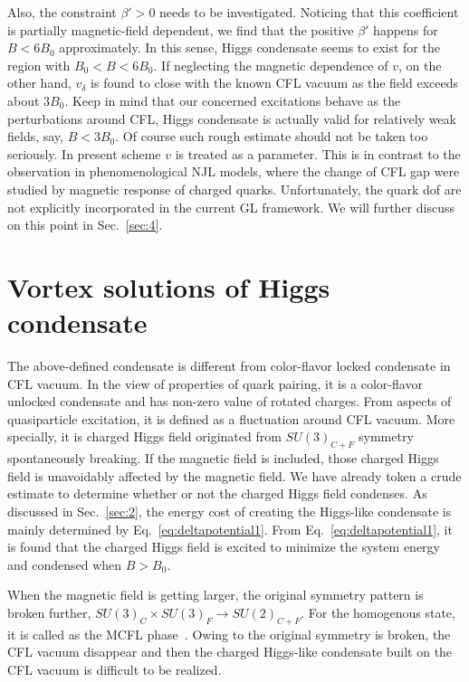 \documentclass[12pt]{article}
\begin{document}
Also, the constraint $\beta'> 0$ needs to be investigated. Noticing that this coefficient is
partially magnetic-field dependent, we find that the positive $\beta'$ happens for $B < 6 B_0$ approximately.
In this sense, Higgs condensate seems to exist for the region with $B_0< B < 6 B_0$.
If neglecting the magnetic dependence of $v$, on the other hand, $v_\delta$ is found to close with the known
CFL vacuum as the field exceeds about $3 B_0$. Keep in mind that our concerned excitations behave as the
perturbations around CFL, Higgs condensate is actually valid for relatively weak fields, say, $B < 3 B_0$.
Of course such rough estimate should not be taken too seriously.
In present scheme $v$ is treated as a parameter. This is in contrast to the
observation in phenomenological NJL models, where the change of CFL gap were studied by magnetic response of charged quarks. 
Unfortunately, the quark dof are not explicitly incorporated in the current GL framework.
We will further discuss on this point in Sec.~\ref{sec:4}.


\section{\bf Vortex solutions of Higgs condensate}
\label{sec:3}
\vspace{0.2cm}

The above-defined condensate is different from color-flavor
locked condensate in CFL vacuum.
In the view of properties of quark pairing, it is a color-flavor unlocked condensate
and has non-zero value of rotated charges.
From aspects of quasiparticle excitation, it is
defined as a fluctuation around CFL vacuum.
More specially, it is charged Higgs field originated from $SU(3)_{C+F}$
 symmetry spontaneously breaking.
If the magnetic field is included,
those charged Higgs field is unavoidably affected by the magnetic field.
We  have already token a crude estimate to determine whether or not the 
charged Higgs field condenses.
As discussed in Sec.~\ref{sec:2}, the energy cost of creating the Higgs-like condensate
is mainly determined by Eq.~\eqref{eq:deltapotential1}.
From Eq.~\eqref{eq:deltapotential1}, 
it is found that the charged Higgs field is excited 
to minimize the system energy
and condensed when $B >B_0$.


When the magnetic field is getting larger, the original
symmetry pattern is broken further, $SU(3)_C \times SU(3)_F \rightarrow SU(2)_{C+F}$.
For the homogenous state, it is called as the MCFL
phase~\cite{ferrer2005magnetic,ferrer2006magnetic}. 
Owing to the original symmetry is broken,
the CFL vacuum  disappear and then the charged  Higgs-like condensate 
built on the CFL vacuum  is difficult to be realized.
\end{document}
